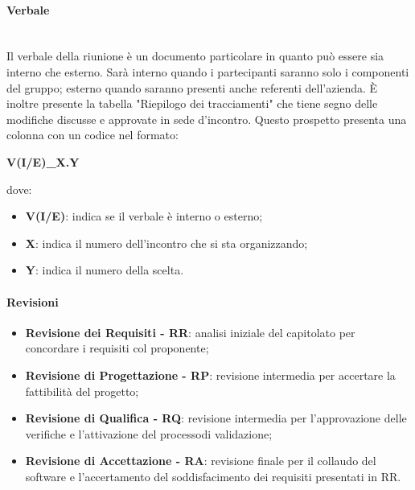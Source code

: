                 \paragraph{Verbale}\mbox{}\\ [1mm]
                    Il verbale della riunione è un documento particolare in quanto può essere sia interno che esterno. Sarà interno quando
                    i partecipanti saranno solo i componenti del gruppo; esterno quando saranno presenti anche referenti dell'azienda.
                    È inoltre presente la tabella "Riepilogo dei tracciamenti" che tiene segno delle modifiche discusse e
                    approvate in sede d'incontro. Questo prospetto presenta una colonna con un codice nel formato: \newline \newline
                    \centerline{\textbf{V(I/E)\_X.Y}} \newline \newline
                    dove:
                    \begin{itemize}
                        \item \textbf{V(I/E)}: indica se il verbale è interno o esterno;
                        \item \textbf{X}: indica il numero dell'incontro che si sta organizzando;
                        \item \textbf{Y}: indica il numero della scelta.
                    \end{itemize}
                \paragraph{Revisioni}
                \begin{itemize}
                    \item \textbf{Revisione dei Requisiti - RR}: analisi iniziale del capitolato per concordare i requisiti col proponente;
                    \item \textbf{Revisione di Progettazione - RP}: revisione intermedia per accertare la fattibilità del progetto\glo;
                    \item \textbf{Revisione di Qualifica - RQ}: revisione intermedia per l'approvazione delle verifiche e l'attivazione del processo\glosp di validazione\glo;
                    \item \textbf{Revisione di Accettazione - RA}: revisione finale per il collaudo del software e l'accertamento del soddisfacimento dei requisiti presentati in RR.
                \end{itemize}
